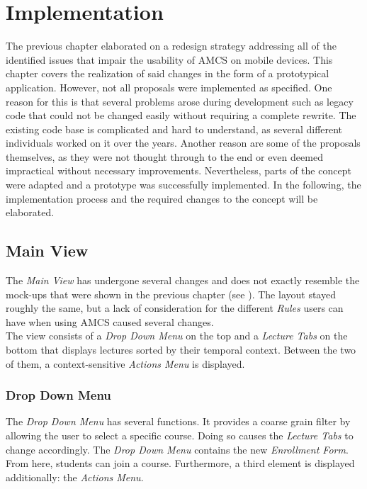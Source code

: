 \chapter{Implementation}
\label{chapter:implementation}

The previous chapter elaborated on a redesign strategy addressing all of the identified issues that impair the usability of AMCS on mobile devices.
This chapter covers the realization of said changes in the form of a prototypical application. However, not all proposals were implemented as specified. One reason for this is that several problems arose during development such as legacy code that could not be changed easily without requiring a complete rewrite. The existing code base is complicated and hard to understand, as several different individuals worked on it over the years. Another reason are some of the proposals themselves, as they were not thought through to the end or even deemed impractical without necessary improvements. Nevertheless, parts of the concept were adapted and a prototype was successfully implemented.
In the following, the implementation process and the required changes to the concept will be elaborated.

\section{Main View}

The \emph{Main View} has undergone several changes and does not exactly resemble the mock-ups that were shown in the previous chapter (see ). The layout stayed roughly the same, but a lack of consideration for the different \emph{Rules} users can have when using AMCS caused several changes.
\\
The view consists of a \emph{Drop Down Menu} on the top and a \emph{Lecture Tabs} on the bottom that displays lectures sorted by their temporal context. Between the two of them, a context-sensitive \emph{Actions Menu} is displayed.

\subsection{Drop Down Menu}
The \emph{Drop Down Menu} has several functions. It provides a coarse grain filter by allowing the user to select a specific course. Doing so causes the \emph{Lecture Tabs} to change accordingly. The \emph{Drop Down Menu} contains the new \emph{Enrollment Form}. From here, students can join a course.
Furthermore, a third element is displayed additionally: the \emph{Actions Menu}.
